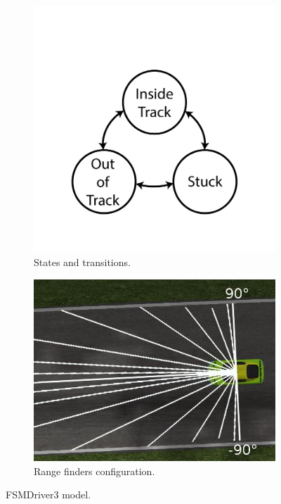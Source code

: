 \begin{figure}
\centering
\begin{subfigure}[b]{0.4\textwidth}
   \includegraphics[width=\textwidth]{img/ThreeStateFSM}
   \caption{States and transitions.}\label{fig:FSMDriver3Model}%
\end{subfigure}
\begin{subfigure}[b]{0.4\textwidth}
   \includegraphics[width=\textwidth]{img/FSM3Sensors}
   \caption{Range finders configuration.}\label{fig:FSMDriver3Finders}%
\end{subfigure}
   \caption{FSMDriver3 model.}\label{fig:FSMDriver3}
\end{figure}

